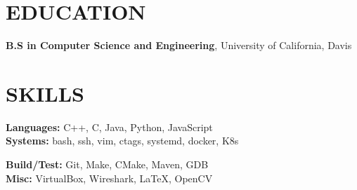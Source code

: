 \documentclass[letterpaper, 10pt, centered]{res} %
\begin{document}
\begin{resume}
\section{EDUCATION}
\textbf{B.S in Computer Science and Engineering}, University of California, Davis
\vspace{-6pt}

\section{SKILLS}
\vspace{0pt}
\begin{multicols}{2}
	\textbf{Languages:} C++, C, Java, Python, JavaScript \\
	\textbf{Systems:} bash, ssh, vim, ctags, systemd, docker, K8s \\
	
	\columnbreak
	
	\textbf{Build/Test:} Git, Make, CMake, Maven, GDB \\
	\textbf{Misc:} VirtualBox, Wireshark, LaTeX, OpenCV \\
\end{multicols}

\end{resume}
\end{document}
